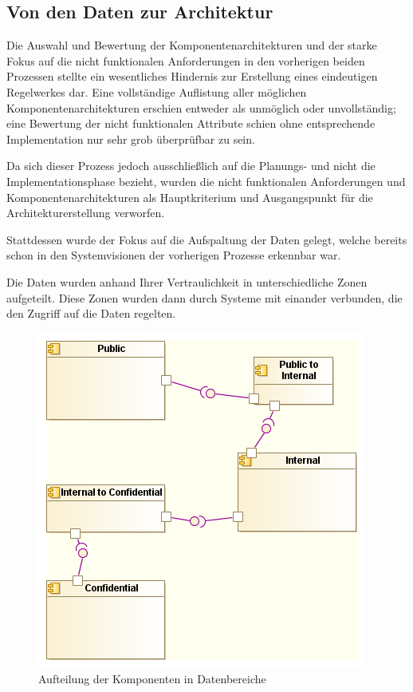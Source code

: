 \subsection{Von den Daten zur Architektur}
Die Auswahl und Bewertung der Komponentenarchitekturen und der starke Fokus auf die nicht funktionalen Anforderungen in den vorherigen beiden Prozessen stellte ein wesentliches Hindernis zur Erstellung eines eindeutigen Regelwerkes dar. Eine vollständige Auflistung aller möglichen Komponentenarchitekturen erschien entweder als unmöglich oder unvollständig; eine Bewertung der nicht funktionalen Attribute schien ohne entsprechende Implementation nur sehr grob überprüfbar zu sein.

Da sich dieser Prozess jedoch ausschließlich auf die Planungs- und nicht die Implementationsphase bezieht, wurden die nicht funktionalen Anforderungen und Komponentenarchitekturen als Hauptkriterium und Ausgangspunkt für die Architekturerstellung verworfen.

Stattdessen wurde der Fokus auf die Aufspaltung der Daten gelegt, welche bereits schon in den Systemvisionen der vorherigen Prozesse erkennbar war.

Die Daten wurden anhand Ihrer Vertraulichkeit in unterschiedliche Zonen aufgeteilt. Diese Zonen wurden dann durch Systeme mit einander verbunden, die den Zugriff auf die Daten regelten.

\begin{figure}[!htbp]
    \centering
    \includegraphics[scale=0.7]{uml/vision3.png}
    \caption{Aufteilung der Komponenten in Datenbereiche}
\end{figure}


